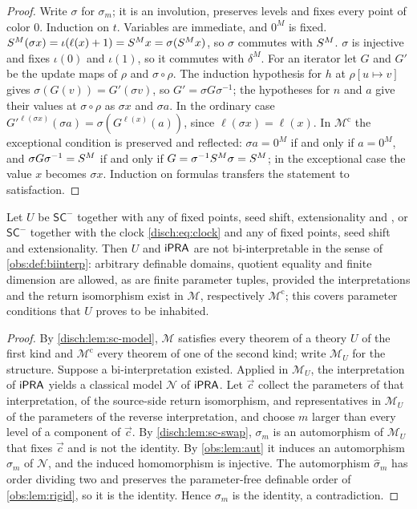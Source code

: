 \begin{proof}
Write $\sigma$ for $\sigma_m$; it is an involution, preserves levels and fixes
every point of color $0$. Induction on $t$. Variables are immediate, and
$0^M$ is fixed. $S^M(\sigma x)=\iota(\ell(x)+1)=S^M x=\sigma(S^M x)$,
so $\sigma$ commutes with $S^M$. $\sigma$ is injective and fixes $\iota(0)$
and $\iota(1)$, so it commutes with $\delta^M$. For an iterator let $G$ and
$G'$ be the update maps of $\rho$ and $\sigma\circ\rho$. The induction
hypothesis for $h$ at $\rho[u\mapsto v]$ gives $\sigma(G(v))=G'(\sigma v)$,
so $G'=\sigma G\sigma^{-1}$; the hypotheses for $n$ and $a$ give their values
at $\sigma\circ\rho$ as $\sigma x$ and $\sigma a$. In the ordinary case
$G'^{\ell(\sigma x)}(\sigma a)=\sigma(G^{\ell(x)}(a))$, since
$\ell(\sigma x)=\ell(x)$. In $\mathcal M^{\mathrm c}$ the exceptional
condition is preserved and reflected: $\sigma a=0^M$ if and only if $a=0^M$,
and $\sigma G\sigma^{-1}=S^M$ if and only if $G=\sigma^{-1}S^M\sigma=S^M$;
in the exceptional case the value $x$ becomes $\sigma x$. Induction on
formulas transfers the statement to satisfaction.
\end{proof}

\begin{theorem}
\label{disch:thm:sc-obs}
Let $U$ be $\mathsf{SC}^{-}$ together with any of fixed points, seed shift,
extensionality and , or $\mathsf{SC}^{-}$ together with the
clock \eqref{disch:eq:clock} and any of fixed points, seed shift and
extensionality. Then $U$ and $\mathsf{iPRA}$ are not bi-interpretable in the sense of
\cref{obs:def:biinterp}: arbitrary definable domains, quotient equality and
finite dimension are allowed, as are finite parameter tuples, provided the
interpretations and the return isomorphism exist in $\mathcal M$,
respectively $\mathcal M^{\mathrm c}$; this covers parameter conditions that
$U$ proves to be inhabited.
\end{theorem}

\begin{proof}
By \cref{disch:lem:sc-model}, $\mathcal M$ satisfies every theorem of a
theory $U$ of the first kind and $\mathcal M^{\mathrm c}$ every theorem of
one of the second kind; write $\mathcal M_U$ for the structure. Suppose a
bi-interpretation existed. Applied in $\mathcal M_U$, the interpretation of
$\mathsf{iPRA}$ yields a classical model $\mathcal N$ of $\mathsf{iPRA}$. Let $\vec c$ collect
the parameters of that interpretation, of the source-side return
isomorphism, and representatives in $\mathcal M_U$ of the parameters of the
reverse interpretation, and choose $m$ larger than every level of a component
of $\vec c$. By \cref{disch:lem:sc-swap}, $\sigma_m$ is an automorphism of
$\mathcal M_U$ that fixes $\vec c$ and is not the identity. By
\cref{obs:lem:aut} it induces an automorphism $\widehat\sigma_m$ of
$\mathcal N$, and the induced homomorphism is injective. The automorphism
$\widehat\sigma_m$ has order dividing two and preserves the parameter-free
definable order of \cref{obs:lem:rigid}, so it is the identity. Hence
$\sigma_m$ is the identity, a contradiction.
\end{proof}

